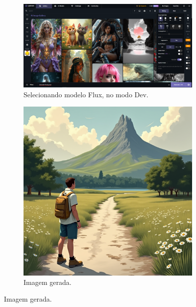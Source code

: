 \begin{figure}[htbp]
    \centering
    \caption{\small Processo da utilização 5 do CGDream (Personagem)}
    \label{fig:cgDream5}
    \begin{subfigure}{0.9\linewidth}
        \includegraphics[width=1\linewidth]{figs/cgDream/tela_char_FluxDev1.png}
        \caption{\small Selecionando modelo Flux, no modo Dev.}
        \label{fig:cgDream5a}
    \end{subfigure}
    \begin{subfigure}{0.7\linewidth}
        \includegraphics[width=1\linewidth]{figs/cgDream/res_char_FluxDev1.png}
        \caption{\small Imagem gerada.}
        \label{fig:cgDream5b}
    \end{subfigure}
\end{figure}

